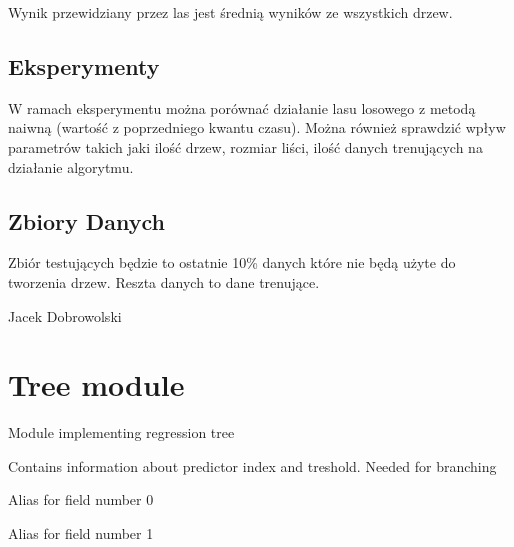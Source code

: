 \documentclass[letterpaper,10pt,english]{sphinxmanual}
\begin{document}
Wynik przewidziany przez las jest średnią wyników ze wszystkich drzew.


\section{Eksperymenty}
\label{\detokenize{dok_wstepna:eksperymenty}}
W ramach eksperymentu można porównać działanie lasu losowego z metodą
naiwną (wartość z poprzedniego kwantu czasu). Można również sprawdzić
wpływ parametrów takich jaki ilość drzew, rozmiar liści, ilość danych
trenujących na działanie algorytmu.


\section{Zbiory Danych}
\label{\detokenize{dok_wstepna:zbiory-danych}}
Zbiór testujących będzie to ostatnie 10\% danych które nie będą użyte do
tworzenia drzew. Reszta danych to dane trenujące.

Jacek Dobrowolski
\label{\detokenize{tree:module-random_forest.tree}}

\chapter{Tree module}
\label{\detokenize{tree:tree-module}}\label{\detokenize{tree::doc}}
Module implementing regression tree

\begin{fulllineitems}
\label{\detokenize{tree:random_forest.tree.Condition}}
Contains information about predictor index and treshold. Needed for branching

\begin{fulllineitems}
\label{\detokenize{tree:random_forest.tree.Condition.index}}
Alias for field number 0

\end{fulllineitems}


\begin{fulllineitems}
\label{\detokenize{tree:random_forest.tree.Condition.value}}
Alias for field number 1

\end{fulllineitems}


\end{fulllineitems}
\end{document}
